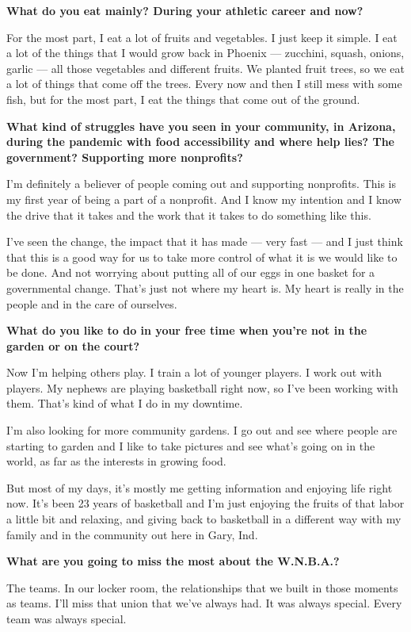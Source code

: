 \textbf{What do you eat mainly? During your athletic career and now?}

For the most part, I eat a lot of fruits and vegetables. I just keep it
simple. I eat a lot of the things that I would grow back in Phoenix ---
zucchini, squash, onions, garlic --- all those vegetables and different
fruits. We planted fruit trees, so we eat a lot of things that come off
the trees. Every now and then I still mess with some fish, but for the
most part, I eat the things that come out of the ground.

\textbf{What kind of struggles have you seen in your community, in
Arizona, during the pandemic with food accessibility and where help
lies? The government? Supporting more nonprofits?}

I'm definitely a believer of people coming out and supporting
nonprofits. This is my first year of being a part of a nonprofit. And I
know my intention and I know the drive that it takes and the work that
it takes to do something like this.

I've seen the change, the impact that it has made --- very fast --- and
I just think that this is a good way for us to take more control of what
it is we would like to be done. And not worrying about putting all of
our eggs in one basket for a governmental change. That's just not where
my heart is. My heart is really in the people and in the care of
ourselves.

\textbf{What do you like to do in your free time when you're not in the
garden or on the court?}

Now I'm helping others play. I train a lot of younger players. I work
out with players. My nephews are playing basketball right now, so I've
been working with them. That's kind of what I do in my downtime.

I'm also looking for more community gardens. I go out and see where
people are starting to garden and I like to take pictures and see what's
going on in the world, as far as the interests in growing food.

But most of my days, it's mostly me getting information and enjoying
life right now. It's been 23 years of basketball and I'm just enjoying
the fruits of that labor a little bit and relaxing, and giving back to
basketball in a different way with my family and in the community out
here in Gary, Ind.

\textbf{What are you going to miss the most about the W.N.B.A.?}

The teams. In our locker room, the relationships that we built in those
moments as teams. I'll miss that union that we've always had. It was
always special. Every team was always special.

